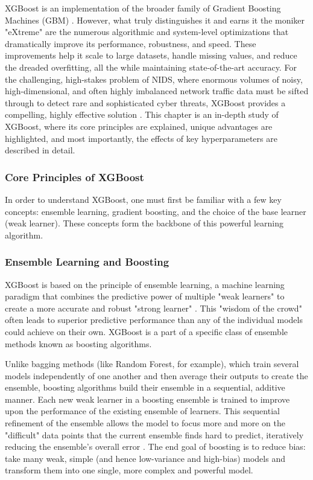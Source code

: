 XGBoost is an implementation of the broader family of Gradient Boosting Machines (GBM) \parencite{al2020survey}. However, what truly distinguishes it and earns it the moniker "eXtreme" are the numerous algorithmic and system-level optimizations that dramatically improve its performance, robustness, and speed. These improvements help it scale to large datasets, handle missing values, and reduce the dreaded overfitting, all the while maintaining state-of-the-art accuracy. For the challenging, high-stakes problem of NIDS, where enormous volumes of noisy, high-dimensional, and often highly imbalanced network traffic data must be sifted through to detect rare and sophisticated cyber threats, XGBoost provides a compelling, highly effective solution \parencite{aldhubaib2024network}. This chapter is an in-depth study of XGBoost, where its core principles are explained, unique advantages are highlighted, and most importantly, the effects of key hyperparameters are described in detail.

\subsubsection{Core Principles of XGBoost} 
In order to understand XGBoost, one must first be familiar with a few key concepts: ensemble learning, gradient boosting, and the choice of the base learner (weak learner). These concepts form the backbone of this powerful learning algorithm.

\subsubsection{Ensemble Learning and Boosting} 
XGBoost is based on the principle of ensemble learning, a machine learning paradigm that combines the predictive power of multiple "weak learners" to create a more accurate and robust "strong learner" \parencite{zou2021survey}. This "wisdom of the crowd" often leads to superior predictive performance than any of the individual models could achieve on their own. XGBoost is a part of a specific class of ensemble methods known as boosting algorithms.

Unlike bagging methods (like Random Forest, for example), which train several models independently of one another and then average their outputs to create the ensemble, boosting algorithms build their ensemble in a sequential, additive manner. Each new weak learner in a boosting ensemble is trained to improve upon the performance of the existing ensemble of learners. This sequential refinement of the ensemble allows the model to focus more and more on the "difficult" data points that the current ensemble finds hard to predict, iteratively reducing the ensemble's overall error \parencite{agrawal2021survey}. The end goal of boosting is to reduce bias: take many weak, simple (and hence low-variance and high-bias) models and transform them into one single, more complex and powerful model.

